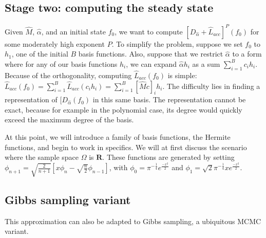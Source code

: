\documentclass{article}
\begin{document}
\subsection{Stage two: computing the steady state}
 Given $\hat{M}$, $\hat{\alpha}$, and an initial state $f_0$, we want to compute $[D_{\hat{\alpha}}+\hat{L}_{acc}]^P(f_0)$ for some moderately high exponent $P$. To simplify the problem, suppose we set $f_0$ to $h_1$, one of the initial $B$ basis functions. Also, suppose that we restrict $\hat{\alpha}$ to a form where for any of our basis functions $h_i$, we can expand $\hat{\alpha}h_i$ as a sum $\sum_{i=1}^B c_i h_i$. Because of the orthogonality, computing $\hat{L}_{acc}(f_0)$ is simple: $\hat{L}_{acc}(f_0) = \sum_{i=1}^B \hat{L}_{acc}(c_i h_i) = \sum_{i=1}^B [\hat{M}c]_i h_i$. The difficulty lies in finding a representation of $[D_{\hat{\alpha}}(f_0)$ in this same basis. The representation cannot be exact, because for example in the polynomial case, its degree would quickly exceed the maximum degree of the basis.

At this point, we will introduce a family of basis functions, the  Hermite functions, and begin to work in specifics. We will at first discuss the scenario where the sample space $\Omega$ is $\mathbf{R}$. %
These functions are generated by setting $\phi_{n+1}=\sqrt{\frac{2}{n+1}}\left[x\phi_n-\sqrt{\frac{n}{2}}\phi_{n-1}\right]$, with $\phi_0=\pi^{-\frac{1}{4}}e^{\frac{-x^2}{2}}$ and $\phi_1=\sqrt{2} \pi^{-\frac{1}{4}}xe^{\frac{-x^2}{2}}$. 


\subsection{Gibbs sampling variant}
This approximation can also be adapted to Gibbs sampling, a ubiquitous MCMC variant. 



\end{document}
